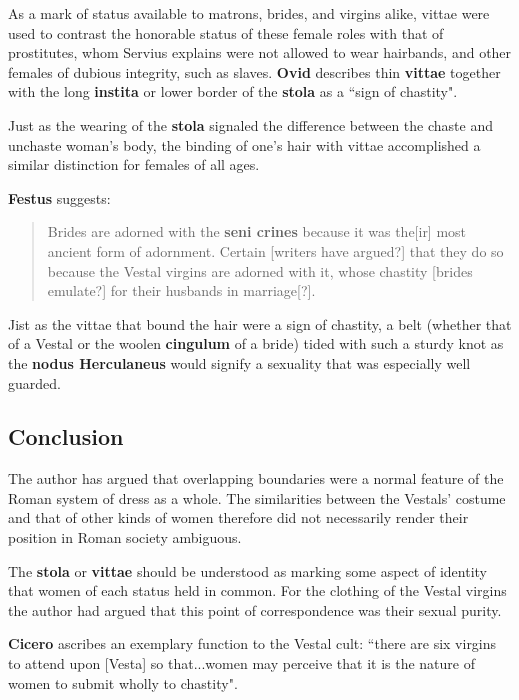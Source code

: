 As a mark of status available to matrons, brides, and virgins alike, vittae were used to contrast the honorable status of these female roles with that of prostitutes, whom Servius explains were not allowed to wear hairbands, and other females of dubious integrity, such as slaves. \textbf{Ovid} describes thin \textbf{vittae} together with the long \textbf{instita} or lower border of the \textbf{stola} as a ``sign of chastity".

\begin{rmk}
    Just as the wearing of the \textbf{stola} signaled the difference between the chaste and unchaste woman's body, the binding of one's hair with vittae accomplished a similar distinction for females of all ages.
\end{rmk}

\textbf{Festus} suggests: 

\begin{quotation}
    Brides are adorned with the \textbf{seni crines} because it was the[ir] most ancient form of adornment. Certain [writers have argued?] that they do so because the Vestal virgins are adorned with it, whose chastity [brides emulate?] for their husbands in marriage[?].
\end{quotation}

Jist as the vittae that bound the hair were a sign of chastity, a belt (whether that of a Vestal or the woolen \textbf{cingulum} of a bride) tided with such a sturdy knot as the \textbf{nodus Herculaneus} would signify a sexuality that was especially well guarded.

\subsection{Conclusion}

The author has argued that overlapping boundaries were a normal feature of the Roman system of dress as a whole. The similarities between the Vestals' costume and that of other kinds of women therefore did not necessarily render their position in Roman society ambiguous.

The \textbf{stola} or \textbf{vittae} should be understood as marking some aspect of identity that women of each status held in common. For the clothing of the Vestal virgins the author had argued that this point of correspondence was their sexual purity.

\textbf{Cicero} ascribes an exemplary function to the Vestal cult: ``there are six virgins to attend upon [Vesta] so that...women may perceive that it is the nature of women to submit wholly to chastity".

